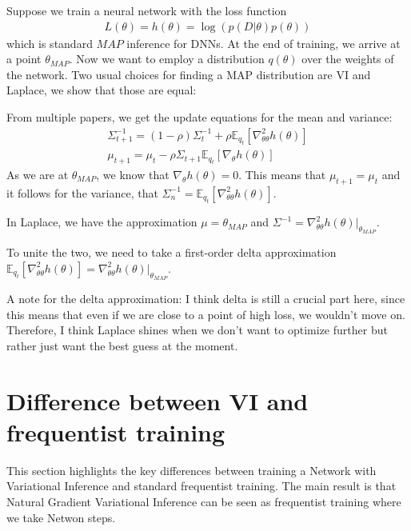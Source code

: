 \documentclass[a4paper]{scrartcl}
\begin{document}
    Suppose we train a neural network with the loss function
    \begin{align}
        L(\theta) = h(\theta) = \log(p(D\vert \theta) p(\theta))
    \end{align}
    which is standard $MAP$ inference for DNNs. At the end of training, we
    arrive at a point $\theta_{MAP}$. Now we want to employ a distribution
    $q(\theta)$ over the weights of the network. Two usual choices for
    finding a MAP distribution are VI and Laplace, we show that those are
    equal:

    From multiple papers, we get the update equations for the mean and variance:
    \begin{align*}
        \Sigma_{t+1}^{-1} = (1-\rho)\Sigma^{-1}_t + \rho \mathbb{E}_{q_t}[\nabla^2_{\theta\theta} h(\theta)]\\
        \mu_{t+1} = \mu_t - \rho \Sigma_{t+1}\mathbb{E}_{q_t}[\nabla_{\theta} h(\theta)]
        \end{align*}
    As we are at $\theta_{MAP}$, we know that $\nabla_{\theta} h(\theta)
    = 0$. This means that $\mu_{t+1} = \mu_t$ and it follows for the variance, that $\Sigma_{n}^{-1} = \mathbb{E}_{q_t}[\nabla^2_{\theta\theta} h(\theta)]$.

    In Laplace, we have the approximation $\mu = \theta_{MAP}$ and $\Sigma^{-1} = \nabla^2_{\theta\theta} h(\theta) \vert_{\theta_{MAP}}$.

    To unite the two, we need to take a first-order delta approximation $\mathbb{E}_{q_t}[\nabla^2_{\theta\theta} h(\theta)] =\nabla^2_{\theta\theta} h(\theta) \vert_{\theta_{MAP}}$.

    A note for the delta approximation: I think delta is still a crucial
    part here, since this means that even if we are close to a point of high
    loss, we wouldn't move on. Therefore, I think Laplace shines when we
    don't want to optimize further but rather just want the best guess at
    the moment.


\section{Difference between VI and frequentist training}
  This section highlights the key differences between training a Network
  with Variational Inference and standard frequentist training. The main
  result is that Natural Gradient Variational Inference can be seen as frequentist training
  where we take Netwon steps.
\end{document}

